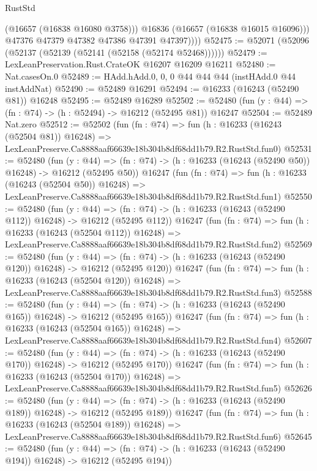 \begin{lexlean}{RustStd}
\begin{coremodule}
                (@16657 (@16838 @16080 @3758)))
              @16836
              (@16657 (@16838 @16015 @16096)))
            @47376
            @47379
            @47382
            @47386
            @47391
            @47397))))
@52475 := @52071 (@52096 (@52137 (@52139 (@52141 (@52158 (@52174 @52468))))))
@52479 := LexLeanPreservation.Rust.CrateOK @16207 @16209 @16211
@52480 := Nat.casesOn.{0}
@52489 := HAdd.hAdd.{0, 0, 0} @44 @44 @44 (instHAdd.{0} @44 instAddNat)
@52490 := @52489 @16291
@52494 := @16233 (@16243 (@52490 @81)) @16248
@52495 := @52489 @16289
@52502 := @52480 (fun (y : @44) => (fn : @74) -> (h : @52494) -> @16212 (@52495 @81)) @16247
@52504 := @52489 Nat.zero
@52512 := @52502
    (fun (fn : @74) =>
    fun (h : @16233 (@16243 (@52504 @81)) @16248) =>
    LexLeanPreserve.Ca8888aaf66639e18b304b8df68dd1b79.R2.RustStd.fun0)
@52531 := @52480
    (fun (y : @44) =>
    (fn : @74) -> (h : @16233 (@16243 (@52490 @50)) @16248) -> @16212 (@52495 @50))
    @16247
    (fun (fn : @74) =>
    fun (h : @16233 (@16243 (@52504 @50)) @16248) =>
    LexLeanPreserve.Ca8888aaf66639e18b304b8df68dd1b79.R2.RustStd.fun1)
@52550 := @52480
    (fun (y : @44) =>
    (fn : @74) -> (h : @16233 (@16243 (@52490 @112)) @16248) -> @16212 (@52495 @112))
    @16247
    (fun (fn : @74) =>
    fun (h : @16233 (@16243 (@52504 @112)) @16248) =>
    LexLeanPreserve.Ca8888aaf66639e18b304b8df68dd1b79.R2.RustStd.fun2)
@52569 := @52480
    (fun (y : @44) =>
    (fn : @74) -> (h : @16233 (@16243 (@52490 @120)) @16248) -> @16212 (@52495 @120))
    @16247
    (fun (fn : @74) =>
    fun (h : @16233 (@16243 (@52504 @120)) @16248) =>
    LexLeanPreserve.Ca8888aaf66639e18b304b8df68dd1b79.R2.RustStd.fun3)
@52588 := @52480
    (fun (y : @44) =>
    (fn : @74) -> (h : @16233 (@16243 (@52490 @165)) @16248) -> @16212 (@52495 @165))
    @16247
    (fun (fn : @74) =>
    fun (h : @16233 (@16243 (@52504 @165)) @16248) =>
    LexLeanPreserve.Ca8888aaf66639e18b304b8df68dd1b79.R2.RustStd.fun4)
@52607 := @52480
    (fun (y : @44) =>
    (fn : @74) -> (h : @16233 (@16243 (@52490 @170)) @16248) -> @16212 (@52495 @170))
    @16247
    (fun (fn : @74) =>
    fun (h : @16233 (@16243 (@52504 @170)) @16248) =>
    LexLeanPreserve.Ca8888aaf66639e18b304b8df68dd1b79.R2.RustStd.fun5)
@52626 := @52480
    (fun (y : @44) =>
    (fn : @74) -> (h : @16233 (@16243 (@52490 @189)) @16248) -> @16212 (@52495 @189))
    @16247
    (fun (fn : @74) =>
    fun (h : @16233 (@16243 (@52504 @189)) @16248) =>
    LexLeanPreserve.Ca8888aaf66639e18b304b8df68dd1b79.R2.RustStd.fun6)
@52645 := @52480
    (fun (y : @44) =>
    (fn : @74) -> (h : @16233 (@16243 (@52490 @194)) @16248) -> @16212 (@52495 @194))

\end{coremodule}
\end{lexlean}
